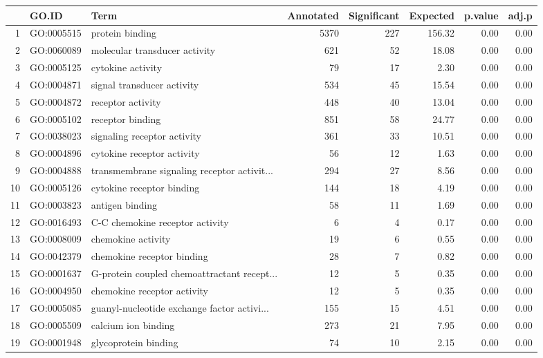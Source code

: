 \begin{table}[ht]
\centering
\begin{tabular}{rllrrrrr}
  \hline
 & GO.ID & Term & Annotated & Significant & Expected & p.value & adj.p \\ 
  \hline
1 & GO:0005515 & protein binding & 5370 & 227 & 156.32 & 0.00 & 0.00 \\ 
  2 & GO:0060089 & molecular transducer activity & 621 &  52 & 18.08 & 0.00 & 0.00 \\ 
  3 & GO:0005125 & cytokine activity &  79 &  17 & 2.30 & 0.00 & 0.00 \\ 
  4 & GO:0004871 & signal transducer activity & 534 &  45 & 15.54 & 0.00 & 0.00 \\ 
  5 & GO:0004872 & receptor activity & 448 &  40 & 13.04 & 0.00 & 0.00 \\ 
  6 & GO:0005102 & receptor binding & 851 &  58 & 24.77 & 0.00 & 0.00 \\ 
  7 & GO:0038023 & signaling receptor activity & 361 &  33 & 10.51 & 0.00 & 0.00 \\ 
  8 & GO:0004896 & cytokine receptor activity &  56 &  12 & 1.63 & 0.00 & 0.00 \\ 
  9 & GO:0004888 & transmembrane signaling receptor activit... & 294 &  27 & 8.56 & 0.00 & 0.00 \\ 
  10 & GO:0005126 & cytokine receptor binding & 144 &  18 & 4.19 & 0.00 & 0.00 \\ 
  11 & GO:0003823 & antigen binding &  58 &  11 & 1.69 & 0.00 & 0.00 \\ 
  12 & GO:0016493 & C-C chemokine receptor activity &   6 &   4 & 0.17 & 0.00 & 0.00 \\ 
  13 & GO:0008009 & chemokine activity &  19 &   6 & 0.55 & 0.00 & 0.00 \\ 
  14 & GO:0042379 & chemokine receptor binding &  28 &   7 & 0.82 & 0.00 & 0.00 \\ 
  15 & GO:0001637 & G-protein coupled chemoattractant recept... &  12 &   5 & 0.35 & 0.00 & 0.00 \\ 
  16 & GO:0004950 & chemokine receptor activity &  12 &   5 & 0.35 & 0.00 & 0.00 \\ 
  17 & GO:0005085 & guanyl-nucleotide exchange factor activi... & 155 &  15 & 4.51 & 0.00 & 0.00 \\ 
  18 & GO:0005509 & calcium ion binding & 273 &  21 & 7.95 & 0.00 & 0.00 \\ 
  19 & GO:0001948 & glycoprotein binding &  74 &  10 & 2.15 & 0.00 & 0.00 \\ 

\end{tabular}
\end{table}
